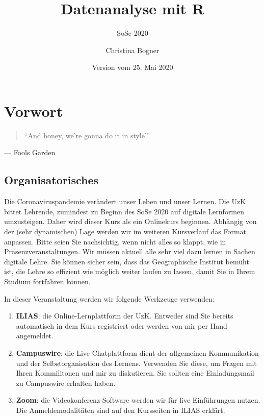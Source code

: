 \documentclass[]{book}
\title{Datenanalyse mit R}
\subtitle{SoSe 2020}
\author{Christina Bogner}
\date{Version vom 25. Mai 2020}
\providecommand{\tightlist}{%
  \setlength{\itemsep}{0pt}\setlength{\parskip}{0pt}}
\newenvironment{rmdinfo}{
  \definecolor{info}{rgb}{0.94, 0.97, 1.0}  %
  \color{black}
  \begin{mdframed}[backgroundcolor = info]}
 {\end{mdframed}}
\begin{document}
\maketitle

{
\setcounter{tocdepth}{1}
\tableofcontents
}
\hypertarget{vorwort}{%
\chapter{Vorwort}\label{vorwort}}

\begin{quote}
``And honey, we're gonna do it in style''
\end{quote}

\hfill --- Fools Garden

\hypertarget{organisatorisches}{%
\section{Organisatorisches}\label{organisatorisches}}

\begin{rmdinfo}
Die Coronaviruspandemie verändert unser Leben und unser Lernen. Die UzK
bittet Lehrende, zumindest zu Beginn des SoSe 2020 auf digitale
Lernformen umzusteigen. Daher wird dieser Kurs als ein Onlinekurs
beginnen. Abhängig von der (sehr dynamischen) Lage werden wir im
weiteren Kursverlauf das Format anpassen. Bitte seien Sie nachsichtig,
wenn nicht alles so klappt, wie in Präsenzveranstaltungen. Wir müssen
aktuell alle sehr viel dazu lernen in Sachen digitale Lehre. Sie können
sicher sein, dass das Geographische Institut bemüht ist, die Lehre so
effizient wie möglich weiter laufen zu lassen, damit Sie in Ihrem
Studium fortfahren können.
\end{rmdinfo}

In dieser Veranstaltung werden wir folgende Werkzeuge verwenden:

\begin{enumerate}
\def\labelenumi{\arabic{enumi}.}
\tightlist
\item
  \textbf{ILIAS}: die Online-Lernplattform der UzK. Entweder sind Sie bereits automatisch in dem Kurs registriert oder werden von mir per Hand angemeldet.
\item
  \textbf{Campuswire}: die Live-Chatplattform dient der allgemeinen Kommunikation und der Selbstorganisation des Lernens. Verwenden Sie diese, um Fragen mit Ihren Kommilitonen und mir zu diskutieren. Sie sollten eine Einladungsmail zu Campuswire erhalten haben.
\item
  \textbf{Zoom}: die Videokonferenz-Software werden wir für live Einführungen nutzen. Die Anmeldemodalitäten sind auf den Kursseiten in ILIAS erklärt.
\end{enumerate}
\end{document}
